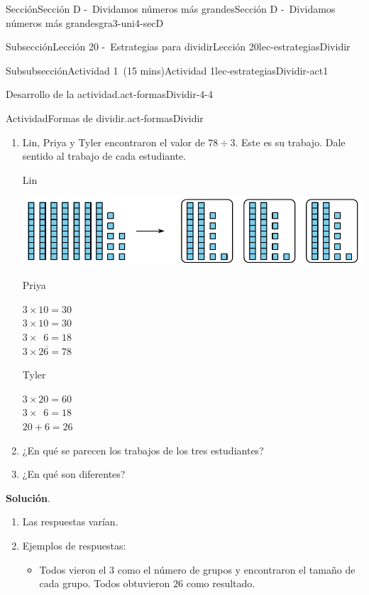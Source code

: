 \documentclass[oneside,10pt,]{article}
\newcommand{\blocktitlefont}{\relax}
\begin{document}
\begin{sectionptx}{Sección}{Sección D -~Dividamos números más grandes}{}{Sección D -~Dividamos números más grandes}{}{}{gra3-uni4-secD}
\begin{subsectionptx}{Subsección}{Lección 20 -~Estrategias para dividir}{}{Lección 20}{}{}{lec-estrategiasDividir}
\begin{subsubsectionptx}{Subsubsección}{Actividad 1~(15 mins)}{}{Actividad 1}{}{}{lec-estrategiasDividir-act1}
\begin{paragraphs}{Desarrollo de la actividad.}{act-formasDividir-4-4}
\begin{itemize}[label=\textbullet]
\end{itemize}
\end{paragraphs}%
\begin{activity}{Actividad}{Formas de dividir.}{act-formasDividir}%
%
\begin{enumerate}
\item{}Lin, Priya y Tyler encontraron el valor de \(78 \div 3\). Este es su trabajo. Dale sentido al trabajo de cada estudiante.%
\par
Lin%
\par
\begin{image}{0}{1}{0}{}%
\includegraphics[width=\linewidth]{external/svg-source/tikz-file-149344-scale13.pdf}
\end{image}%
%
\begin{sidebyside}{2}{0}{0}{0}%
\begin{sbspanel}{0.5}%
Priya%
\par
\(3\times 10 = 30\)\\
 \(3\times 10 = 30\)\\
 \(3\times \phantom{0}6 = 18\)\\
 \(\overline {3 \times 26 =78}\)%
\end{sbspanel}%
\begin{sbspanel}{0.5}%
Tyler%
\par
\(3\times 20 = 60\)\\
 \(3\times \phantom{0}6 = 18\)\\
 \(20 + 6 = 26\)%
\end{sbspanel}%
\end{sidebyside}%
\item{}¿En qué se parecen los trabajos de los tres estudiantes?%
\item{}¿En qué son diferentes?%
\end{enumerate}
\par\smallskip%
\noindent\textbf{\blocktitlefont Solución}.\hypertarget{act-formasDividir-3}{}\quad{}%
\begin{enumerate}
\item{}Las respuestas varían.%
\item{}Ejemplos de respuestas:%
%
\begin{itemize}[label=\textbullet]
\item{}Todos vieron el \(3\) como el número de grupos y encontraron el tamaño de cada grupo. Todos obtuvieron \(26\) como resultado.%

\end{itemize}
\end{enumerate}
\end{activity}
\end{subsubsectionptx}
\end{subsectionptx}
\end{sectionptx}
\end{document}
